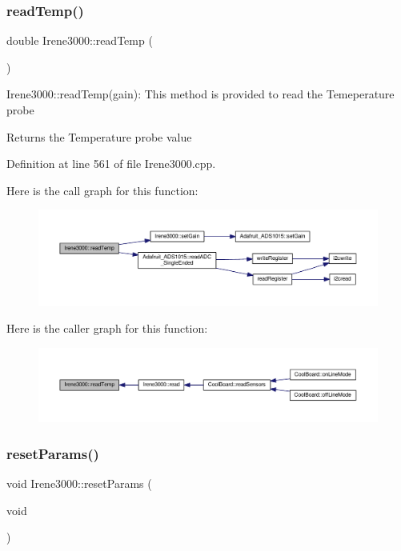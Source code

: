 \subsubsection{\texorpdfstring{read\+Temp()}{readTemp()}}
{\footnotesize\ttfamily double Irene3000\+::read\+Temp (\begin{DoxyParamCaption}{ }\end{DoxyParamCaption})}

Irene3000\+::read\+Temp(gain)\+: This method is provided to read the Temeperature probe

\begin{DoxyReturn}{Returns}
the Temperature probe value 
\end{DoxyReturn}


Definition at line 561 of file Irene3000.\+cpp.

Here is the call graph for this function\+:\nopagebreak
\begin{figure}[H]
\begin{center}
\leavevmode
\includegraphics[width=350pt]{class_irene3000_a80bc6dfea106dc3bc54fa20204d4d5dc_cgraph}
\end{center}
\end{figure}
Here is the caller graph for this function\+:\nopagebreak
\begin{figure}[H]
\begin{center}
\leavevmode
\includegraphics[width=350pt]{class_irene3000_a80bc6dfea106dc3bc54fa20204d4d5dc_icgraph}
\end{center}
\end{figure}
\mbox{\label{class_irene3000_a43b0e44f8d211413ff4e3a0c654205ff}} 
\subsubsection{\texorpdfstring{reset\+Params()}{resetParams()}}
{\footnotesize\ttfamily void Irene3000\+::reset\+Params (\begin{DoxyParamCaption}\item[{void}]{ }\end{DoxyParamCaption})}

